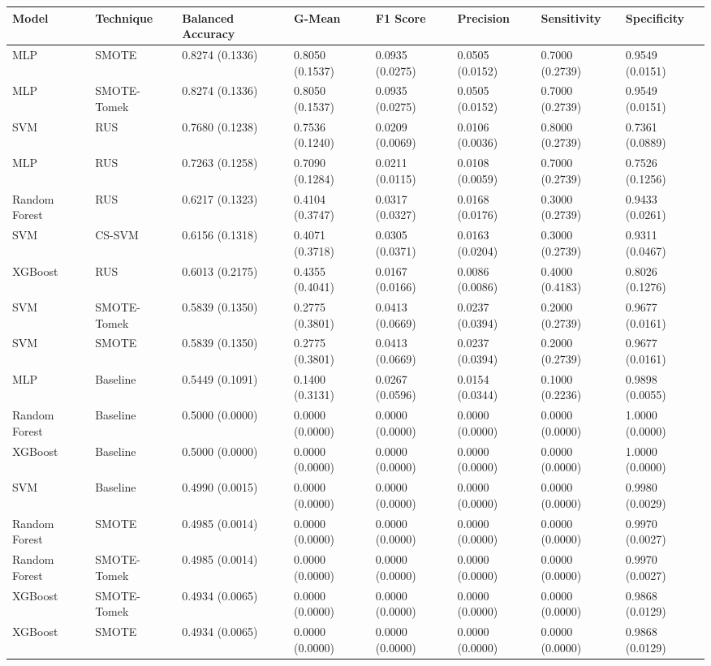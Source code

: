 \begin{tabular}{llllllll}
\toprule
Model & Technique & Balanced Accuracy & G-Mean & F1 Score & Precision & Sensitivity & Specificity \\
\midrule
MLP & SMOTE & 0.8274 (0.1336) & 0.8050 (0.1537) & 0.0935 (0.0275) & 0.0505 (0.0152) & 0.7000 (0.2739) & 0.9549 (0.0151) \\
MLP & SMOTE-Tomek & 0.8274 (0.1336) & 0.8050 (0.1537) & 0.0935 (0.0275) & 0.0505 (0.0152) & 0.7000 (0.2739) & 0.9549 (0.0151) \\
SVM & RUS & 0.7680 (0.1238) & 0.7536 (0.1240) & 0.0209 (0.0069) & 0.0106 (0.0036) & 0.8000 (0.2739) & 0.7361 (0.0889) \\
MLP & RUS & 0.7263 (0.1258) & 0.7090 (0.1284) & 0.0211 (0.0115) & 0.0108 (0.0059) & 0.7000 (0.2739) & 0.7526 (0.1256) \\
Random Forest & RUS & 0.6217 (0.1323) & 0.4104 (0.3747) & 0.0317 (0.0327) & 0.0168 (0.0176) & 0.3000 (0.2739) & 0.9433 (0.0261) \\
SVM & CS-SVM & 0.6156 (0.1318) & 0.4071 (0.3718) & 0.0305 (0.0371) & 0.0163 (0.0204) & 0.3000 (0.2739) & 0.9311 (0.0467) \\
XGBoost & RUS & 0.6013 (0.2175) & 0.4355 (0.4041) & 0.0167 (0.0166) & 0.0086 (0.0086) & 0.4000 (0.4183) & 0.8026 (0.1276) \\
SVM & SMOTE-Tomek & 0.5839 (0.1350) & 0.2775 (0.3801) & 0.0413 (0.0669) & 0.0237 (0.0394) & 0.2000 (0.2739) & 0.9677 (0.0161) \\
SVM & SMOTE & 0.5839 (0.1350) & 0.2775 (0.3801) & 0.0413 (0.0669) & 0.0237 (0.0394) & 0.2000 (0.2739) & 0.9677 (0.0161) \\
MLP & Baseline & 0.5449 (0.1091) & 0.1400 (0.3131) & 0.0267 (0.0596) & 0.0154 (0.0344) & 0.1000 (0.2236) & 0.9898 (0.0055) \\
Random Forest & Baseline & 0.5000 (0.0000) & 0.0000 (0.0000) & 0.0000 (0.0000) & 0.0000 (0.0000) & 0.0000 (0.0000) & 1.0000 (0.0000) \\
XGBoost & Baseline & 0.5000 (0.0000) & 0.0000 (0.0000) & 0.0000 (0.0000) & 0.0000 (0.0000) & 0.0000 (0.0000) & 1.0000 (0.0000) \\
SVM & Baseline & 0.4990 (0.0015) & 0.0000 (0.0000) & 0.0000 (0.0000) & 0.0000 (0.0000) & 0.0000 (0.0000) & 0.9980 (0.0029) \\
Random Forest & SMOTE & 0.4985 (0.0014) & 0.0000 (0.0000) & 0.0000 (0.0000) & 0.0000 (0.0000) & 0.0000 (0.0000) & 0.9970 (0.0027) \\
Random Forest & SMOTE-Tomek & 0.4985 (0.0014) & 0.0000 (0.0000) & 0.0000 (0.0000) & 0.0000 (0.0000) & 0.0000 (0.0000) & 0.9970 (0.0027) \\
XGBoost & SMOTE-Tomek & 0.4934 (0.0065) & 0.0000 (0.0000) & 0.0000 (0.0000) & 0.0000 (0.0000) & 0.0000 (0.0000) & 0.9868 (0.0129) \\
XGBoost & SMOTE & 0.4934 (0.0065) & 0.0000 (0.0000) & 0.0000 (0.0000) & 0.0000 (0.0000) & 0.0000 (0.0000) & 0.9868 (0.0129) \\
\bottomrule
\end{tabular}
